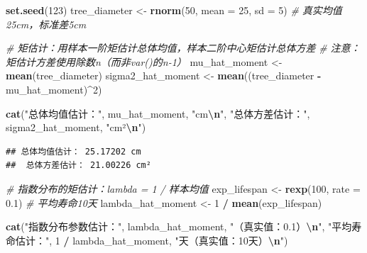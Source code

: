 \documentclass[
  twoside,12pt,fontset=none]{ctexbook}
\newenvironment{Shaded}{\begin{snugshade}}{\end{snugshade}}
\newcommand{\AttributeTok}[1]{\textcolor[rgb]{0.13,0.29,0.53}{#1}}
\newcommand{\CommentTok}[1]{\textcolor[rgb]{0.56,0.35,0.01}{\textit{#1}}}
\newcommand{\DecValTok}[1]{\textcolor[rgb]{0.00,0.00,0.81}{#1}}
\newcommand{\FloatTok}[1]{\textcolor[rgb]{0.00,0.00,0.81}{#1}}
\newcommand{\FunctionTok}[1]{\textcolor[rgb]{0.13,0.29,0.53}{\textbf{#1}}}
\newcommand{\NormalTok}[1]{#1}
\newcommand{\OtherTok}[1]{\textcolor[rgb]{0.56,0.35,0.01}{#1}}
\newcommand{\SpecialCharTok}[1]{\textcolor[rgb]{0.81,0.36,0.00}{\textbf{#1}}}
\newcommand{\StringTok}[1]{\textcolor[rgb]{0.31,0.60,0.02}{#1}}
\begin{document}
\begin{Shaded}
\begin{Highlighting}[]
\FunctionTok{set.seed}\NormalTok{(}\DecValTok{123}\NormalTok{)}
\NormalTok{tree\_diameter }\OtherTok{\textless{}{-}} \FunctionTok{rnorm}\NormalTok{(}\DecValTok{50}\NormalTok{, }\AttributeTok{mean =} \DecValTok{25}\NormalTok{, }\AttributeTok{sd =} \DecValTok{5}\NormalTok{)  }\CommentTok{\# 真实均值25cm，标准差5cm}

\CommentTok{\# 矩估计：用样本一阶矩估计总体均值，样本二阶中心矩估计总体方差}
\CommentTok{\# 注意：矩估计方差使用除数n（而非var()的n{-}1）}
\NormalTok{mu\_hat\_moment }\OtherTok{\textless{}{-}} \FunctionTok{mean}\NormalTok{(tree\_diameter)}
\NormalTok{sigma2\_hat\_moment }\OtherTok{\textless{}{-}} \FunctionTok{mean}\NormalTok{((tree\_diameter }\SpecialCharTok{{-}}\NormalTok{ mu\_hat\_moment)}\SpecialCharTok{\^{}}\DecValTok{2}\NormalTok{)}

\FunctionTok{cat}\NormalTok{(}\StringTok{"总体均值估计："}\NormalTok{, mu\_hat\_moment, }\StringTok{"cm}\SpecialCharTok{\textbackslash{}n}\StringTok{"}\NormalTok{,}
    \StringTok{"总体方差估计："}\NormalTok{, sigma2\_hat\_moment, }\StringTok{"cm²}\SpecialCharTok{\textbackslash{}n}\StringTok{"}\NormalTok{)}
\end{Highlighting}
\end{Shaded}

\begin{verbatim}
## 总体均值估计： 25.17202 cm
##  总体方差估计： 21.00226 cm²
\end{verbatim}

\begin{Shaded}
\begin{Highlighting}[]
\CommentTok{\# 指数分布的矩估计：lambda = 1 / 样本均值}
\NormalTok{exp\_lifespan }\OtherTok{\textless{}{-}} \FunctionTok{rexp}\NormalTok{(}\DecValTok{100}\NormalTok{, }\AttributeTok{rate =} \FloatTok{0.1}\NormalTok{)  }\CommentTok{\# 平均寿命10天}
\NormalTok{lambda\_hat\_moment }\OtherTok{\textless{}{-}} \DecValTok{1} \SpecialCharTok{/} \FunctionTok{mean}\NormalTok{(exp\_lifespan)}

\FunctionTok{cat}\NormalTok{(}\StringTok{"指数分布参数估计："}\NormalTok{, lambda\_hat\_moment, }\StringTok{"（真实值：0.1）}\SpecialCharTok{\textbackslash{}n}\StringTok{"}\NormalTok{,}
    \StringTok{"平均寿命估计："}\NormalTok{, }\DecValTok{1} \SpecialCharTok{/}\NormalTok{ lambda\_hat\_moment, }\StringTok{"天（真实值：10天）}\SpecialCharTok{\textbackslash{}n}\StringTok{"}\NormalTok{)}
\end{Highlighting}
\end{Shaded}
\end{document}
